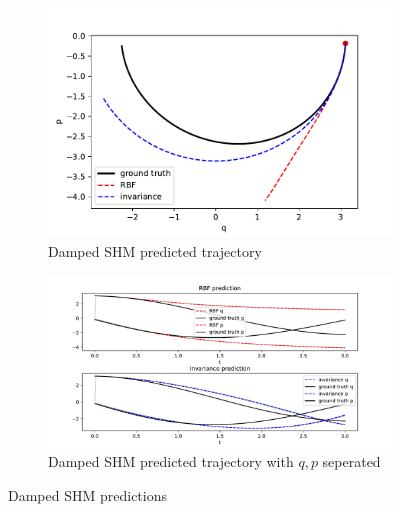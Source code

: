 \documentclass{statsmsc}
\begin{document}
\begin{figure}[H]
     \centering
     \begin{subfigure}[b]{\linewidth}
        \centering
        \includegraphics[width=\linewidth]{../codes/figures/damped_shm_predicted_trajectory.pdf}
        \caption{Damped SHM predicted trajectory}
        \label{fig:damped_shm_prediction_combined}
     \end{subfigure}
     \hfill
     \begin{subfigure}[b]{\linewidth}
         \centering
         \includegraphics[width=\linewidth]{../codes/figures/damped_shm_predicted_trajectory_seperate.pdf}
         \caption{Damped SHM predicted trajectory with $q, p$ seperated}
         \label{fig:damped_shm_prediction_seperate}
     \end{subfigure}
        \caption{Damped SHM predictions}
        \label{fig:damped_shm_prediction}
\end{figure}
\end{document}
